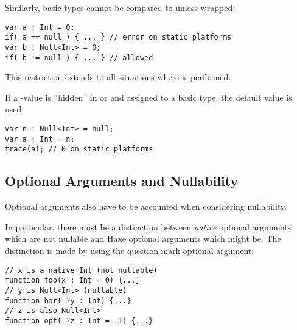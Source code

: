 Similarly, basic types cannot be compared to  unless wrapped:

\begin{lstlisting}
var a : Int = 0;
if( a == null ) { ... } // error on static platforms
var b : Null<Int> = 0;
if( b != null ) { ... } // allowed
\end{lstlisting}

This restriction extends to all situations where  is performed.


If a -value is ``hidden'' in  or  and assigned to a basic type, the default value is used:

\begin{lstlisting}
var n : Null<Int> = null;
var a : Int = n;
trace(a); // 0 on static platforms
\end{lstlisting}



\subsection{Optional Arguments and Nullability}
\label{types-nullability-optional-arguments}

Optional arguments also have to be accounted when considering nullability.

In particular, there must be a distinction between \emph{native} optional arguments which are not nullable and Haxe optional arguments which might be.  The distinction is made by using the question-mark optional argument:

\begin{lstlisting}
// x is a native Int (not nullable)
function foo(x : Int = 0) {...}
// y is Null<Int> (nullable)
function bar( ?y : Int) {...}
// z is also Null<Int>
function opt( ?z : Int = -1) {...}
\end{lstlisting}

